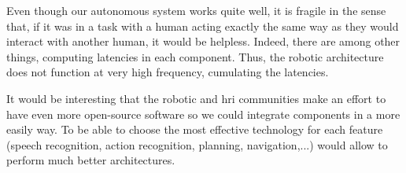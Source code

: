 \documentclass[a4paper,11pt,twoside]{StyleThese}
\begin{document}
Even though our autonomous system works quite well, it is fragile in the sense that, if it was in a task with a human acting exactly the same way as they would interact with another human, it would be helpless. Indeed, there are among other things, computing latencies in each component. Thus, the robotic architecture does not function at very high frequency, cumulating the latencies. 

It would be interesting that the robotic and \acrshort{hri} communities make an effort to have even more open-source software so we could integrate components in a more easily way. To be able to choose the most effective technology for each feature (speech recognition, action recognition, planning, navigation,...) would allow to perform much better architectures.


\ifdefined{}
\else


\end{document}

